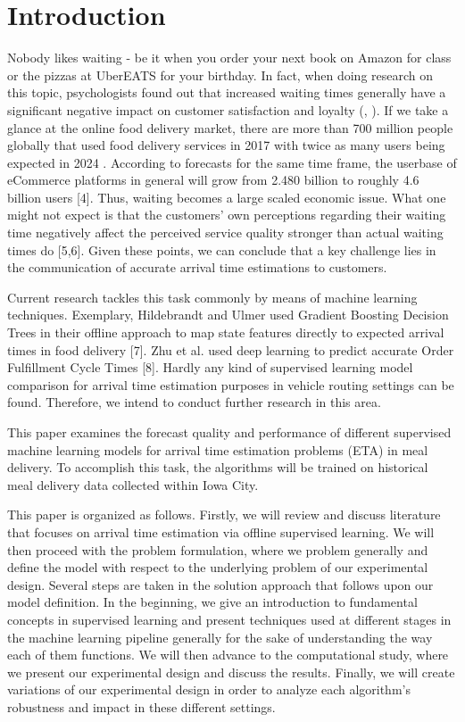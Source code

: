 \chapter{Introduction}

Nobody likes waiting - be it when you order your next book on Amazon for class or the pizzas at UberEATS for your birthday. In fact, when doing research on this topic, psychologists found out that increased waiting times generally have a significant negative impact on customer satisfaction and loyalty (\citealt{WaitingTime1}, \citealt{WaitingTime2}). If we take a glance at the online food delivery market, there are more than 700 million people globally that used food delivery services in 2017 with twice as many users being expected in 2024 \citep{Statista1}. According to forecasts for the same time frame, the userbase of eCommerce platforms in general will grow from 2.480 billion to roughly 4.6 billion users [4]. Thus, waiting becomes a large scaled economic issue. What one might not expect is that the customers’ own perceptions regarding their waiting time negatively affect the perceived service quality stronger than actual waiting times do [5,6]. Given these points, we can conclude that a key challenge lies in the communication of accurate arrival time estimations to customers. 

Current research tackles this task commonly by means of machine learning techniques. Exemplary, Hildebrandt and Ulmer used Gradient Boosting Decision Trees in their offline approach to map state features directly to expected arrival times in food delivery [7]. Zhu et al. used deep learning to predict accurate Order Fulfillment Cycle Times [8]. Hardly any kind of supervised learning model comparison for arrival time estimation purposes in vehicle routing settings can be found. Therefore, we intend to conduct further research in this area.  

This paper examines the forecast quality and performance of different supervised machine learning models for arrival time estimation problems (ETA) in meal delivery. To accomplish this task, the algorithms will be trained on historical meal delivery data collected within Iowa City. 

This paper is organized as follows. Firstly, we will review and discuss literature that focuses on arrival time estimation via offline supervised learning. We will then proceed with the problem formulation, where we problem generally and define the model with respect to the underlying problem of our experimental design. Several steps are taken in the solution approach that follows upon our model definition. In the beginning, we give an introduction to fundamental concepts in supervised learning and present techniques used at different stages in the machine learning pipeline generally for the sake of understanding the way each of them functions. We will then advance to the computational study, where we present our experimental design and discuss the results. Finally, we will create variations of our experimental design in order to analyze each algorithm’s robustness and impact in these different settings.